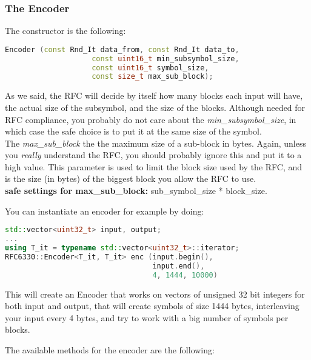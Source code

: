 \documentclass[11pt,a4paper]{refart}
\begin{document}
\subsubsection{The Encoder}
The constructor is the following:
\begin{lstlisting}[language=C++]
Encoder (const Rnd_It data_from, const Rnd_It data_to,
					const uint16_t min_subsymbol_size,
					const uint16_t symbol_size,
					const size_t max_sub_block);
\end{lstlisting}

As we said, the RFC will decide by itself how many blocks each input will have, the actual size of the subsymbol, and the size of the blocks. Although needed for RFC compliance, you probably do not care about the \textit{min\_subsymbol\_size}, in which case the safe choice is to put it at the same size of the symbol.\\
The \textit{max\_sub\_block} the the maximum size of a sub-block in bytes. Again, unless you \textit{really} understand the RFC, you should probably ignore this and put it to a high value. This parameter is used to limit the block size used by the RFC, and is the size (in bytes) of the biggest block you allow the RFC to use.\\
\textbf{safe settings for max\_sub\_block:} sub\_symbol\_size * block\_size.


You can instantiate an encoder for example by doing:

\begin{lstlisting}[language=C++]
std::vector<uint32_t> input, output;
...
using T_it = typename std::vector<uint32_t>::iterator;
RFC6330::Encoder<T_it, T_it> enc (input.begin(),
                                  input.end(),
                                  4, 1444, 10000)
\end{lstlisting}

This will create an Encoder that works on vectors of unsigned 32 bit integers for both input and output, that will create symbols of size 1444 bytes, interleaving
your input every 4 bytes, and try to work with a big number of symbols per blocks.

The available methods for the encoder are the following:
\end{document}
